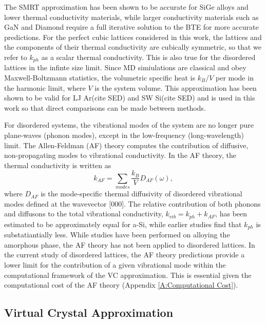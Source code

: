 \documentclass[aps,prb,onecolumn,preprint,superscriptaddress,amsmath,amssymb,floatfix]{revtex4}
\begin{document}
The SMRT approximation has been shown to be accurate for SiGe alloys  
and lower thermal conductivity materials, while larger conductivity 
materials such as GaN and Diamond require a full 
iterative solution to the BTE for more accurate predictions.
\cite{garg_role_2011,lindsay_thermal_2012,ward_intrinsic_2010} 
For the perfect cubic lattices considered in this 
work, the lattices and the components of their 
thermal conductivity are cubically symmetric, so that we refer to 
$k_{ph}$ as a scalar thermal conductivity. 
This is also true for the disordered lattices 
in the infinte size limit. 
Since MD simiulations are classical 
and obey Maxwell-Boltzmann 
statistics,\cite{mcquarrie_statistical_2000} the volumetric 
specific heat is $k_{B}/V$ per mode in the harmonic limit, where $V$ 
is the system volume. This approximation has been shown to be valid 
for LJ Ar(cite SED) and SW Si(cite SED) 
and is used 
in this work so that direct comparisons can be made between methods.

For disordered systems, the vibrational modes of the system are no 
longer pure plane-waves (phonon modes), except in the low-frequency 
(long-wavelength) limit. The Allen-Feldman (AF) theory computes 
the contribution of diffusive, non-propagating modes to vibrational 
conductivity.\cite{allen_thermal_1993} 
In the AF theory, the thermal conductivity is written as
\begin{equation}\label{EQ:M:k_AF}
k_{AF} = \sum_{modes} \frac{k_{B}}{V} D_{AF}(\omega),
\end{equation}
where $D_{AF}$ is the mode-specific thermal diffusivity of  
disordered vibrational modes defined at the wavevector [000].   
The relative contribution of both
phonons and diffusons to the total vibrational 
conductivity, $k_{vib} = k_{ph} + k_{AF}$, has been estimated 
to be approximately equal for a-Si,\cite{he_heat_2011} while earlier 
studies find that $k_{ph}$ is substatiantially less.
\cite{feldman_numerical_1999} 
While studies have been performed on alloying the amorphous phase, the 
AF theory has not been applied to disordered lattices.
\cite{feldman_thermal_1993} In the current study of disordered lattices, 
the AF theory predictions provide a lower limit for the contribution 
of a given vibrational mode within the computational 
framework of the VC approximation. This is essential given 
the computational cost of the AF theory 
(Appendix \ref{A:Computational Cost}). 

\subsection{\label{S:Virtual Crystal}Virtual Crystal Approximation}
\end{document}
